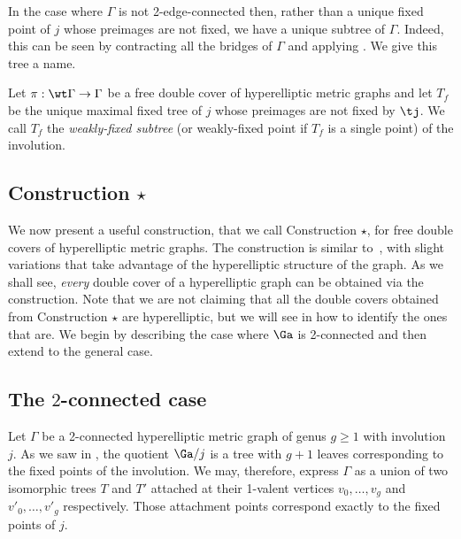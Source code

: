 {\begin{rema}\label{rem:fixedpoints}
    In the case where $\Gamma$ is not 2-edge-connected then, rather than  a unique fixed point of $j$  whose preimages are not fixed, we have a unique subtree of $\Gamma$. Indeed, this can be seen by contracting all the bridges of $\Gamma$ and applying . We give this tree a name. 
    \end{rema}


\begin{defi}\label{def:weaklyFixed}
    Let $\pi:\wt\Gamma\to\Gamma$ be a free double cover of hyperelliptic metric graphs and let $T_f$ be the unique maximal fixed tree of $j$ whose preimages are not fixed by $\tj$. We call $T_f$ the \emph{weakly-fixed subtree} (or weakly-fixed point if $T_f$ is a single point) of the involution. 
\end{defi}

\subsection{Construction  \texorpdfstring{$\star$}{*}}
We now present a useful construction, that we call Construction $\star$, for free double covers of  hyperelliptic metric graphs. The construction is similar 
 to~\cite[Construction A]{LZ22}, with slight variations that take advantage of the hyperelliptic structure of the graph. 
As we shall see,  \emph{every} double cover of a hyperelliptic graph can be obtained via the construction.  
Note that we are not claiming that all the double covers obtained from Construction $\star$ are hyperelliptic, but we will see in 
how to identify the ones that are. 
We begin by describing the case where $\Ga$ is 2-connected and then extend to the general case.

\subsection{The \texorpdfstring{$2$}{2}-connected case}\label{sec:2edgeconnectedcase}
Let $\Gamma$ be  a 2-connected hyperelliptic metric graph of genus $g\geq 1$  with involution $j$.
 As we saw in  , the quotient $\Ga/j$ is a tree with $g+1$ leaves corresponding to the fixed points of the involution. We may, therefore, express $\Gamma$ as a union of two isomorphic trees 
 $T$ and $T'$ attached at their 1-valent vertices  $v_0,\dots,v_{g}$ and   $v'_0,\dots,v'_{g}$ respectively. Those attachment points correspond exactly to the fixed points of $j$. 
 
}
